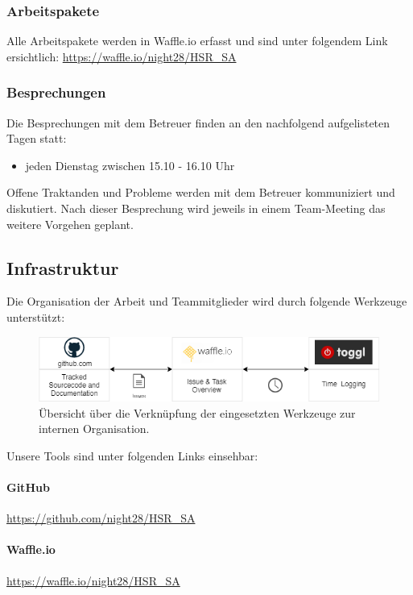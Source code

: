 \subsubsection{Arbeitspakete}
Alle Arbeitspakete werden in Waffle.io erfasst und sind unter folgendem Link ersichtlich:
\href{Waffle.io}{https://waffle.io/night28/HSR\_SA}
\subsubsection{Besprechungen}
Die Besprechungen mit dem Betreuer finden an den nachfolgend aufgelisteten Tagen statt:
\begin{itemize}
	\item jeden Dienstag zwischen 15.10 - 16.10 Uhr
\end{itemize}

Offene Traktanden und Probleme werden mit dem Betreuer kommuniziert und diskutiert. Nach dieser Besprechung wird jeweils in einem Team-Meeting das weitere Vorgehen geplant.


\subsection{Infrastruktur}
Die Organisation der Arbeit und Teammitglieder wird durch folgende Werkzeuge unterstützt:

\begin{figure}[H]
	\centering
	\includegraphics[width=13cm]{img/EingesetzteToolsZurOrganisation.png}
	\caption{Übersicht über die Verknüpfung der eingesetzten Werkzeuge zur internen Organisation.}
	\label{fig:Interne Organisationsstruktur}
\end{figure} 

Unsere Tools sind unter folgenden Links einsehbar:
\paragraph{GitHub} \href{https://github.com/night28/HSR_SA}{https://github.com/night28/HSR\_SA} 

\paragraph{Waffle.io} \href{https://waffle.io/night28/HSR\_SA}{https://waffle.io/night28/HSR\_SA}

